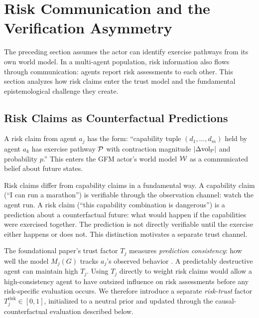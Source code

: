 \section{Risk Communication and the Verification Asymmetry}
\label{sec:communication}

The preceding section assumes the actor can identify exercise pathways from
its own world model. In a multi-agent population, risk information also flows
through communication: agents report risk assessments to each other. This
section analyzes how risk claims enter the trust model and the fundamental
epistemological challenge they create.

\subsection{Risk Claims as Counterfactual Predictions}

A risk claim from agent $a_j$ has the form: ``capability tuple $(d_1, \ldots,
d_m)$ held by agent $a_k$ has exercise pathway $\mathcal{P}$ with contraction
magnitude $|\Delta {\operatorname{vol}_{\mathrm{P}}}|$ and probability $p$.'' This enters the GFM actor's
world model $\mathcal{W}$ as a communicated belief about future states.

Risk claims differ from capability claims in a fundamental way. A capability
claim (``I can run a marathon'') is verifiable through the observation
channel: watch the agent run. A risk claim (``this capability combination is
dangerous'') is a prediction about a counterfactual future: what would happen
if the capabilities were exercised together. The prediction is not directly
verifiable until the exercise either happens or does not. This
distinction motivates a separate trust channel.

The foundational paper's trust factor $T_j$ measures \emph{prediction
consistency}: how well the model $M_j(G)$ tracks $a_j$'s observed behavior
\citep{lasser2026gfm}. A predictably destructive agent can maintain high
$T_j$. Using $T_j$ directly to weight risk claims would allow a
high-consistency agent to have outsized influence on risk assessments before
any risk-specific evaluation occurs. We therefore introduce a separate
\emph{risk-trust} factor $T_j^{\mathrm{risk}} \in [0, 1]$, initialized to
a neutral prior and updated through the causal-counterfactual evaluation
described below.

